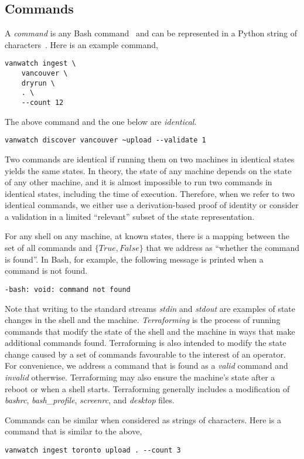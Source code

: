 \subsection{Commands}
\label{commands}

A \emph{command} is any Bash command~ and can be represented in a Python string of characters~. Here is an example command,
%
\begin{verbatim}
vanwatch ingest \
    vancouver \
    dryrun \
    . \
    --count 12
\end{verbatim}
%
The above command and the one below are \emph{identical}.
%
\begin{verbatim}
vanwatch discover vancouver ~upload --validate 1
\end{verbatim}
%
Two commands are identical if running them on two machines in identical states yields the same states. In theory, the state of any machine depends on the state of any other machine, and it is almost impossible to run two commands in identical states, including the time of execution. Therefore, when we refer to two identical commands, we either use a derivation-based proof of identity or consider a validation in a limited ``relevant'' subset of the state representation.

For any shell on any machine, at known states, there is a mapping between the set of all commands and $\{True,False\}$ that we address as ``whether the command is found''. In Bash, for example, the following message is printed when a command is not found.
%
\begin{verbatim}
-bash: void: command not found
\end{verbatim}
%
Note that writing to the standard streams \emph{stdin} and \emph{stdout} are examples of state changes in the shell and the machine. \emph{Terraforming} is the process of running commands that modify the state of the shell and the machine in ways that make additional commands found. Terraforming is also intended to modify the state change caused by a set of commands favourable to the interest of an operator. For convenience, we address a command that is found as a \emph{valid} command and \emph{invalid} otherwise. Terraforming may also ensure the machine's state after a reboot or when a shell starts. Terraforming generally includes a modification of \emph{bashrc}, \emph{bash\_profile}, \emph{screenrc}, and \emph{desktop} files.

Commands can be similar when considered as strings of characters. Here is a command that is similar to the above,
%
\begin{verbatim}
vanwatch ingest toronto upload . --count 3
\end{verbatim}

